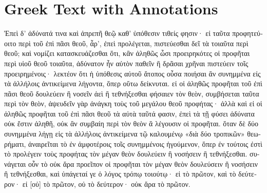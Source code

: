 \section*{Greek Text with Annotations}

\begin{greek}
\raggedright

Ἐπεὶ δ' ἀδύνατά τινα καὶ ἀπρεπῆ θεῷ καθ' ὑπόθεσιν τιθείς φησιν· εἰ ταῦτα προφητεύοιτο περὶ τοῦ ἐπὶ πᾶσι θεοῦ, ἆρ', ἐπεὶ προλέγεται, πιστεύεσθαι δεῖ τὰ τοιαῦτα περὶ θεοῦ; καὶ νομίζει κατασκευάζεσθαι ὅτι, κἂν ἀληθῶς ὦσι προειρηκότες οἱ προφῆται περὶ υἱοῦ θεοῦ τοιαῦτα, ἀδύνατον ἦν αὐτὸν παθεῖν ἢ δρᾶσαι χρῆναι πιστεύειν τοῖς προειρημένοις· λεκτέον ὅτι ἡ ὑπόθεσις αὐτοῦ ἄτοπος οὖσα ποιήσαι ἂν συνημμένα εἰς τὰ ἀλλήλοις ἀντικείμενα λήγοντα, ὅπερ οὕτω δείκνυται. εἰ οἱ ἀληθῶς προφῆται τοῦ ἐπὶ πᾶσι θεοῦ δουλεύειν ἢ νοσεῖν ἀεὶ ἢ τεθνήξεσθαι φήσαιεν τὸν θεὸν, συμβήσεται ταῦτα περὶ τὸν θεὸν, ἀψευδεῖν γὰρ ἀνάγκη τοὺς τοῦ μεγάλου θεοῦ προφήτας· ἀλλὰ καὶ εἰ οἱ ἀληθῶς προφῆται τοῦ ἐπὶ πᾶσι θεοῦ τὰ αὐτὰ ταῦτά φασιν, ἐπεὶ τὰ τῇ φύσει ἀδύνατα οὐκ ἔστιν ἀληθῆ, οὐκ ἂν συμβαίη περὶ τὸν θεὸν ἃ λέγουσιν οἱ προφῆται. ὅταν δὲ δύο συνημμένα λήγῃ εἰς τὰ ἀλλήλοις ἀντικείμενα τῷ καλουμένῳ «διὰ δύο τροπικῶν» θεωρήματι, ἀναιρεῖται τὸ ἐν ἀμφοτέροις τοῖς συνημμένοις ἡγούμενον, ὅπερ ἐν τούτοις ἐστὶ τὸ προλέγειν τοὺς προφήτας τὸν μέγαν θεὸν δουλεύειν ἢ νοσήσειν ἢ τεθνήξεσθαι. συνάγεται οὖν τὸ οὐκ ἄρα προεῖπον οἱ προφῆται τὸν μέγαν θεὸν δουλεύσειν ἢ νοσήσειν ἢ τεθνήξεσθαι, καὶ ὑπάγεταί γε ὁ λόγος τρόπῳ τοιούτῳ· εἰ τὸ πρῶτον, καὶ τὸ δεύτερον· εἰ [οὐ] τὸ πρῶτον, οὐ τὸ δεύτερον· οὐκ ἄρα τὸ πρῶτον.


\end{greek}
